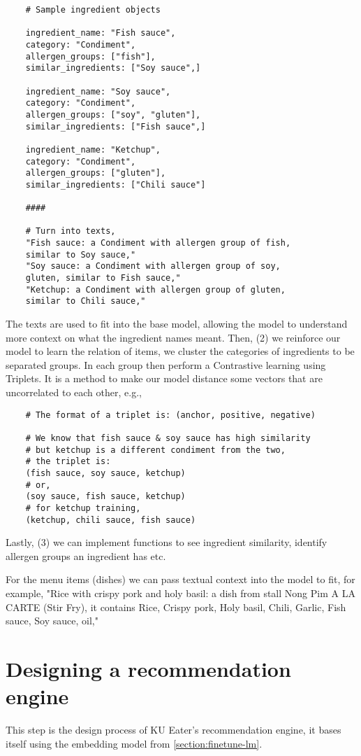 \begin{verbatim}
    # Sample ingredient objects

    ingredient_name: "Fish sauce",
    category: "Condiment",
    allergen_groups: ["fish"],
    similar_ingredients: ["Soy sauce",]

    ingredient_name: "Soy sauce",
    category: "Condiment",
    allergen_groups: ["soy", "gluten"],
    similar_ingredients: ["Fish sauce",]

    ingredient_name: "Ketchup",
    category: "Condiment",
    allergen_groups: ["gluten"],
    similar_ingredients: ["Chili sauce"]

    ####

    # Turn into texts,
    "Fish sauce: a Condiment with allergen group of fish,
    similar to Soy sauce,"
    "Soy sauce: a Condiment with allergen group of soy,
    gluten, similar to Fish sauce,"
    "Ketchup: a Condiment with allergen group of gluten,
    similar to Chili sauce,"
\end{verbatim}

The texts are used to fit into the base model, allowing the model to understand more context on what the ingredient names meant. Then,
(2) we reinforce our model to learn the relation of items, we cluster the categories of ingredients to be separated groups. In each group then
perform a Contrastive learning using Triplets. It is a method to make our model distance some vectors that are uncorrelated to each other, e.g.,

\begin{verbatim}
    # The format of a triplet is: (anchor, positive, negative)

    # We know that fish sauce & soy sauce has high similarity
    # but ketchup is a different condiment from the two,
    # the triplet is:
    (fish sauce, soy sauce, ketchup)
    # or,
    (soy sauce, fish sauce, ketchup)
    # for ketchup training,
    (ketchup, chili sauce, fish sauce)
\end{verbatim}

Lastly, (3) we can implement functions to see ingredient similarity,
identify allergen groups an ingredient has etc.

For the menu items (dishes) we can pass textual context into the model to fit, for example,
"Rice with crispy pork and holy basil: a dish from stall Nong Pim A LA CARTE (Stir Fry),
it contains Rice, Crispy pork, Holy basil, Chili, Garlic, Fish sauce, Soy sauce, oil,"

\section{Designing a recommendation engine}
This step is the design process of KU Eater's recommendation engine,
it bases itself using the embedding model from \ref{section:finetune-lm}.

